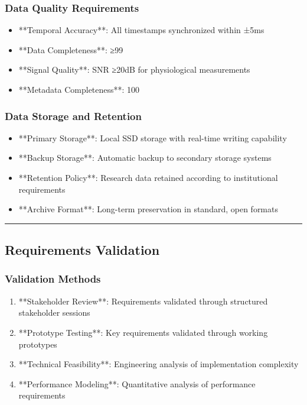 \documentclass[12pt,a4paper]{report}
\begin{document}
\subsubsection{Data Quality Requirements}

\begin{itemize}
\item **Temporal Accuracy**: All timestamps synchronized within ±5ms
\item **Data Completeness**: ≥99%
\item **Signal Quality**: SNR ≥20dB for physiological measurements
\item **Metadata Completeness**: 100%

\end{itemize}
\subsubsection{Data Storage and Retention}

\begin{itemize}
\item **Primary Storage**: Local SSD storage with real-time writing capability
\item **Backup Storage**: Automatic backup to secondary storage systems
\item **Retention Policy**: Research data retained according to institutional requirements
\item **Archive Format**: Long-term preservation in standard, open formats

\end{itemize}
\hrule

\subsection{Requirements Validation}

\subsubsection{Validation Methods}

\begin{enumerate}
\item **Stakeholder Review**: Requirements validated through structured stakeholder sessions
\item **Prototype Testing**: Key requirements validated through working prototypes
\item **Technical Feasibility**: Engineering analysis of implementation complexity
\item **Performance Modeling**: Quantitative analysis of performance requirements

\end{enumerate}
\end{document}
